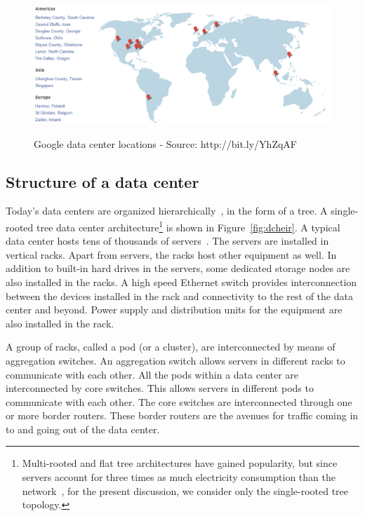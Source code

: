 \begin{figure}
\includegraphics[width=1\textwidth]{pics/googledcmap2.eps}
\label{fig:googledcmap}
\caption{Google data center locations - Source: http://bit.ly/YhZqAF}
\end{figure}

\subsection{Structure of a data center} Today's data centers are organized hierarchically~\cite{dcnetworking:vahdat:micro:2010}, in the form of a tree. A single-rooted tree data center architecture\footnote{Multi-rooted and flat tree architectures have gained popularity, but since servers account for three times as much electricity consumption than the network~\cite{costCloud}, for the present discussion, we consider only the single-rooted tree topology.} is shown in Figure~\ref{fig:dcheir}. A typical data center hosts tens of thousands of servers~\cite{Abts:2012:GTD:2184319.2184335}. The servers are installed in vertical racks. Apart from servers, the racks host other equipment as well. In addition to built-in hard drives in the servers, some dedicated storage nodes are also installed in the racks. A high speed Ethernet switch provides interconnection between the devices installed in the rack and connectivity to the rest of the data center and beyond. Power supply and distribution units for the equipment are also installed in the rack. 

A group of racks, called a pod (or a cluster), are interconnected by means of aggregation switches. An aggregation switch allows servers in different racks to communicate with each other. All the pods within a data center are interconnected by core switches. This allows servers in different pods to communicate with each other. The core switches are interconnected through one or more border routers. These border routers are the avenues for traffic coming in to and going out of the data center. 

